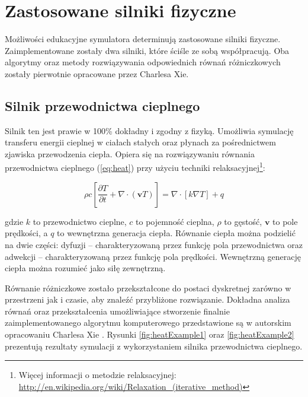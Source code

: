 \section{Zastosowane silniki fizyczne}
\label{sec:silnikiFizyczne}

Możliwości edukacyjne symulatora \en determinują zastosowane silniki fizyczne.
Zaimplementowane zostały dwa silniki, które ściśle ze sobą współpracują. Oba
algorytmy oraz metody rozwiązywania odpowiednich równań różniczkowych  zostały
pierwotnie opracowane przez Charlesa Xie.

\subsection{Silnik przewodnictwa cieplnego}

Silnik ten jest prawie w 100\% dokładny i zgodny z fizyką. Umożliwia symulację
transferu energii cieplnej w ciałach stałych oraz płynach za pośrednictwem
zjawiska przewodzenia ciepła. Opiera się na rozwiązywaniu równania przewodnictwa
cieplnego (\ref{eq:heat}) przy użyciu techniki relaksacyjnej\footnote{ Więcej
informacji o metodzie relaksacyjnej:
\url{http://en.wikipedia.org/wiki/Relaxation_(iterative_method)}}:

\begin{equation}
\label{eq:heat}
\rho c \left[ \frac{\partial T}{\partial t} + \nabla \cdot (\mathbf{v}T) \right] 
= \nabla \cdot [k \nabla T] + q
\end{equation}

gdzie $k$ to przewodnictwo cieplne, $c$ to pojemność cieplna, $\rho$ to gęstość,
$\mathbf{v}$ to pole prędkości, a $q$ to wewnętrzna generacja ciepła. Równanie
ciepła można podzielić na dwie części: dyfuzji -- charakteryzowaną przez funkcję
pola przewodnictwa oraz adwekcji -- charakteryzowaną przez funkcję pola prędkości.
Wewnętrzną generację ciepła można rozumieć jako siłę zewnętrzną.

Równanie różniczkowe zostało przekształcone do postaci dyskretnej zarówno w
przestrzeni jak i czasie, aby znaleźć przybliżone rozwiązanie. Dokładna analiza
równań oraz przekształcenia umożliwiające stworzenie finalnie zaimplementowanego
algorytmu komputerowego przedstawione są w autorskim opracowaniu Charlesa Xie
\cite{heatEquation}. Rysunki \ref{fig:heatExample1} oraz \ref{fig:heatExample2}
prezentują rezultaty symulacji z wykorzystaniem silnika przewodnictwa cieplnego.

